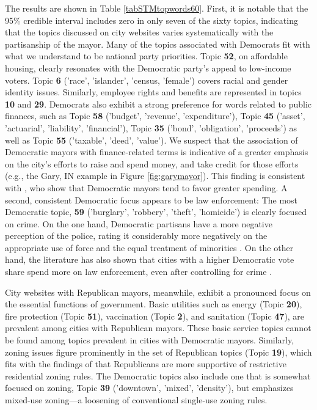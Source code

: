 \documentclass[11pt]{article}
\begin{document}
The results are shown in Table \ref{tabSTMtopwords60}. First, it is notable that the 95\% credible interval includes zero in only seven of the sixty topics, indicating that the topics discussed on city websites varies systematically with the partisanship of the mayor. Many of the topics associated with Democrats fit with what we understand to be national party priorities. Topic \textbf{52}, on affordable housing, clearly resonates with the Democratic party's appeal to low-income voters. Topic {\bf 6} ('race', 'islander', 'census, 'female') covers racial and gender identity issues. Similarly, employee rights and benefits are represented in topics \textbf{10} and \textbf{29}. Democrats also exhibit a strong preference for words related to public finances, such as Topic \textbf{58} ('budget', 'revenue', 'expenditure'), Topic {\bf 45} ('asset', 'actuarial', 'liability', 'financial'), Topic \textbf{35} ('bond', 'obligation', 'proceeds') as well as Topic \textbf{55} ('taxable', 'deed', 'value'). We suspect that the association of Democratic mayors with finance-related terms is indicative of a greater emphasis on the city's efforts to raise and spend money, and take credit for those efforts (e.g., the Gary, IN example in Figure \ref{fig:garymayor}). This finding is consistent with \cite{Einstein2015}, who show that Democratic mayors tend to favor greater spending. A second, consistent Democratic focus appears to be law enforcement: The most Democratic topic, \textbf{59} ('burglary', 'robbery', 'theft', 'homicide') is clearly focused on crime. On the one hand, Democratic partisans have a more negative perception of the police, rating it considerably more negatively on the appropriate use of force and the equal treatment of minorities \citep{brown2017different}. On the other hand, the literature has also shown that cities with a higher Democratic vote share spend more on law enforcement, even after controlling for crime \citep{Einstein2015}. 

City websites with Republican mayors, meanwhile, exhibit a pronounced focus on the essential functions of government. Basic utilities such as energy (Topic \textbf{20}), fire protection (Topic \textbf{51}), vaccination (Topic \textbf{2}),  and sanitation (Topic \textbf{47}), are prevalent among cities with Republican mayors. These basic service topics cannot be found among topics prevalent in cities with Democratic mayors. Similarly, zoning issues figure prominently in the set of Republican topics (Topic \textbf{19}), which fits with the findings of \citet{sorens2018effects} that Republicans are more supportive of restrictive residential zoning rules. The Democratic topics also include one that is somewhat focused on zoning, Topic {\bf 39} ('downtown', 'mixed', 'density'), but emphasizes mixed-use zoning---a loosening of conventional single-use zoning rules.
\end{document}
